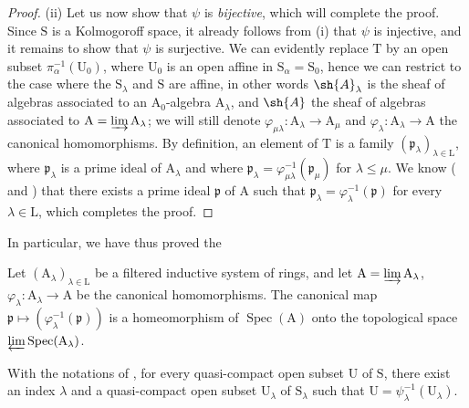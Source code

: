 \begin{proof}
\medskip
\noindent
(ii) Let us now show that $\psi$ is \emph{bijective}, which will complete the proof.
Since $\mathrm{S}$ is a Kolmogoroff space, it already follows from (i) that $\psi$ is injective, and it remains to show that $\psi$ is surjective.
We can evidently replace $\mathrm{T}$ by an open subset $\pi_\alpha^{-1}(\mathrm{U}_0)$, where $\mathrm{U}_0$ is an open affine in $\mathrm{S}_\alpha=\mathrm{S}_0$, hence we can restrict to the case where the $\mathrm{S}_\lambda$ and $\mathrm{S}$ are affine, in other words $\sh{A}_\lambda$ is the sheaf of algebras associated to an $\mathrm{A}_0$-algebra $\mathrm{A}_\lambda$, and $\sh{A}$ the sheaf of algebras associated to $\mathrm{A}=\varinjlim\mathrm{A}_\lambda$; we will still denote $\varphi_{\mu\lambda}:\mathrm{A}_\lambda\to\mathrm{A}_\mu$ and $\varphi_\lambda:\mathrm{A}_\lambda\to\mathrm{A}$ the canonical homomorphisms.
By definition, an element of $\mathrm{T}$ is a family $(\mathfrak{p}_\lambda)_{\lambda\in\mathrm{L}}$, where $\mathfrak{p}_\lambda$ is a prime ideal of $\mathrm{A}_\lambda$ and where $\mathfrak{p}_\lambda=\varphi_{\mu\lambda}^{-1}(\mathfrak{p}_\mu)$ for $\lambda\leqslant\mu$.
We know ( and ) that there exists a prime ideal $\mathfrak{p}$ of $\mathrm{A}$ such that $\mathfrak{p}_\lambda=\varphi_\lambda^{-1}(\mathfrak{p})$ for every $\lambda\in\mathrm{L}$, which completes the proof.
\end{proof}

In particular, we have thus proved the

\begin{corollary}[8.2.10]
\label{IV.8.2.10}
Let $(\mathrm{A}_\lambda)_{\lambda\in\mathrm{L}}$ be a filtered inductive system of rings, and let $\mathrm{A}=\varinjlim\mathrm{A}_\lambda$, $\varphi_\lambda:\mathrm{A}_\lambda\to\mathrm{A}$ be the canonical homomorphisms.
The canonical map $\mathfrak{p}\mapsto(\varphi_\lambda^{-1}(\mathfrak{p}))$ is a homeomorphism of $\operatorname{Spec}(\mathrm{A})$ onto the topological space $\varprojlim\operatorname{Spec}(\mathrm{A}_\lambda)$.
\end{corollary}

\begin{corollary}[8.2.11]
\label{IV.8.2.11}
With the notations of , for every quasi-compact open subset $\mathrm{U}$ of $\mathrm{S}$, there exist an index $\lambda$ and a quasi-compact open subset $\mathrm{U}_\lambda$ of $\mathrm{S}_\lambda$ such that $\mathrm{U}=\psi_\lambda^{-1}(\mathrm{U}_\lambda)$.
\end{corollary}

